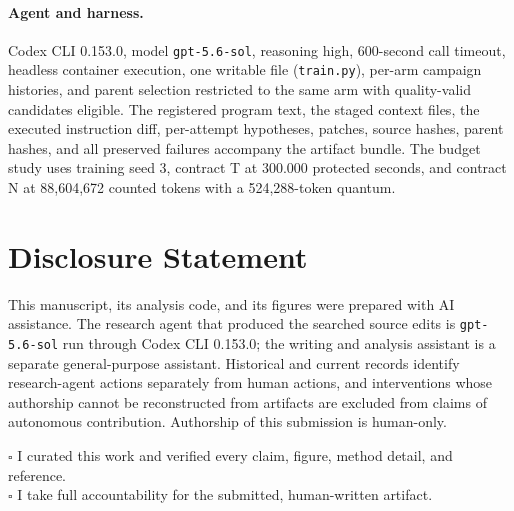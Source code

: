 \documentclass{article}
\begin{document}
\paragraph{Agent and harness.} Codex CLI 0.153.0, model \texttt{gpt-5.6-sol}, reasoning high, 600-second call timeout, headless container execution, one writable file (\texttt{train.py}), per-arm campaign histories, and parent selection restricted to the same arm with quality-valid candidates eligible. The registered program text, the staged context files, the executed instruction diff, per-attempt hypotheses, patches, source hashes, parent hashes, and all preserved failures accompany the artifact bundle. The budget study uses training seed 3, contract T at 300.000 protected seconds, and contract N at 88,604,672 counted tokens with a 524,288-token quantum.

\section{Disclosure Statement}
This manuscript, its analysis code, and its figures were prepared with AI assistance. The research agent that produced the searched source edits is \texttt{gpt-5.6-sol} run through Codex CLI 0.153.0; the writing and analysis assistant is a separate general-purpose assistant. Historical and current records identify research-agent actions separately from human actions, and interventions whose authorship cannot be reconstructed from artifacts are excluded from claims of autonomous contribution. Authorship of this submission is human-only.

\noindent$\square$ I curated this work and verified every claim, figure, method detail, and reference.\\
$\square$ I take full accountability for the submitted, human-written artifact.

\clearpage


\end{document}
